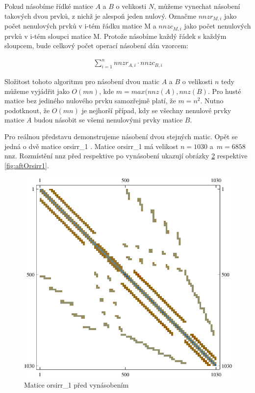 Pokud násobíme řídké matice $A$ a $B$ o velikosti $N$, můžeme vynechat násobení takových dvou prvků, z nichž je alespoň jeden nulový. Označme $nnzr_{M,i}$ jako počet nenulových prvků v i-tém řádku matice M a $nnzc_{M,i}$ jako počet nenulových prvků v i-tém sloupci matice M. Protože násobíme každý řádek s každým sloupcem, bude celkový počet operací násobení dán vzorcem:

\begin{figure}[htb]\label{csrmmm}
\begin{align}
\sum_{i=1}^{n} nnzr_{A,i} \cdot nnzc_{B,i}
\end{align}
\end{figure}

Složitost tohoto algoritmu pro násobení dvou matic $A$ a $B$ o velikosti $n$ tedy můžeme vyjádřit jako $O(mn)$, kde $m = max(nnz(A),nnz(B)$. Pro husté matice bez jediného nulového prvku samozřejmě platí, že $m=n^2$. Nutno podotknout, že $O(mn)$ je nejhorší případ, kdy se všechny nenulové prvky matice $A$ budou násobit se všemi nenulovými prvky matice $B$.

Pro reálnou představu demonstrujeme násobení dvou stejných matic. Opět se jedná o dvě matice orsirr\_1 \cite{mtxors}. Matice orsirr\_1 má velikost $n=1030$ a~$m=6858$ nnz. Rozmístění nnz před respektive po vynásobení ukazují obrázky \ref{fig:befOrsirr1} respektive \ref{fig:aftOrsirr1}.


\begin{figure}[htb]
	\includegraphics[width=1.0\textwidth]{./images/orsirr_1_orig}
	\caption{Matice orsirr\_1 před vynásobením}
	\label{fig:befOrsirr1}
\end{figure}

